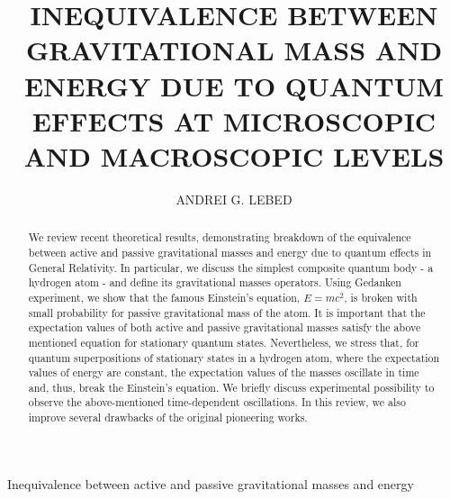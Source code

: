 \documentclass{ws-ijmpd}
\begin{document}
{Inequivalence between active and passive gravitational masses and energy}

%
\catchline{}{}{}{}{}
%

\title{{INEQUIVALENCE BETWEEN GRAVITATIONAL MASS AND ENERGY DUE TO QUANTUM EFFECTS AT MICROSCOPIC AND MACROSCOPIC LEVELS \\
}}

\author{ANDREI G. LEBED}

\address{Department of Physics, University of Arizona, 1118 E. 4th Street,\\
Tucson, Arizona 85721, USA and\\
L.D. Landau Institute for Theoretical Physics, RAS, 2 Kosygina Street,\\
Moscow, 117334 Russia\\
lebed@physics.arizona.edu}


\maketitle

\begin{history}
\end{history}

\begin{abstract}
We review recent theoretical results, demonstrating breakdown of
the equivalence between active and passive gravitational masses
and energy due to quantum effects in General Relativity. In
particular, we discuss the simplest composite quantum body - a
hydrogen atom - and define its gravitational masses operators.
Using Gedanken experiment, we show that the famous Einstein's
equation, $E =mc^2$, is broken with small probability for passive
gravitational mass of the atom. It is important that the
expectation values of both active and passive gravitational masses
satisfy the above mentioned equation for stationary quantum
states. Nevertheless, we stress that, for quantum superpositions
of stationary states in a hydrogen atom, where the expectation
values of energy are constant, the expectation values of the
masses oscillate in time and, thus, break the Einstein's equation.
We briefly discuss experimental possibility to observe the above-mentioned time-dependent oscillations. In this review, we also improve several drawbacks of the original pioneering works.   
\end{abstract}
\end{document}
